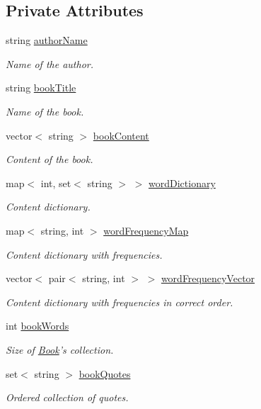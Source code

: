 \subsection*{Private Attributes}
\begin{DoxyCompactItemize}
\item 
string \hyperlink{class_book_a0dcb8f78ffb56c34e28f5d672b422e2a}{author\-Name}
\begin{DoxyCompactList}\small\item\em Name of the author. \end{DoxyCompactList}\item 
string \hyperlink{class_book_a111d7b30bddd6166bd09764f050cfee3}{book\-Title}
\begin{DoxyCompactList}\small\item\em Name of the book. \end{DoxyCompactList}\item 
vector$<$ string $>$ \hyperlink{class_book_a62ca3f4431b699fa41384c8bab7ef4fa}{book\-Content}
\begin{DoxyCompactList}\small\item\em Content of the book. \end{DoxyCompactList}\item 
map$<$ int, set$<$ string $>$ $>$ \hyperlink{class_book_a3e21a804bd433b6c1b05790856ec973f}{word\-Dictionary}
\begin{DoxyCompactList}\small\item\em Content dictionary. \end{DoxyCompactList}\item 
map$<$ string, int $>$ \hyperlink{class_book_a18b73c8d2b492cad5b7b0c187b08dfc0}{word\-Frequency\-Map}
\begin{DoxyCompactList}\small\item\em Content dictionary with frequencies. \end{DoxyCompactList}\item 
vector$<$ pair$<$ string, int $>$ $>$ \hyperlink{class_book_ac58a87d14a302f7d437c1eaa1f1901fb}{word\-Frequency\-Vector}
\begin{DoxyCompactList}\small\item\em Content dictionary with frequencies in correct order. \end{DoxyCompactList}\item 
int \hyperlink{class_book_a36f1e0b30a0ad17606976556cab45a23}{book\-Words}
\begin{DoxyCompactList}\small\item\em Size of \hyperlink{class_book}{Book}'s collection. \end{DoxyCompactList}\item 
set$<$ string $>$ \hyperlink{class_book_a370478eab144c20de936e1b68923e1c0}{book\-Quotes}
\begin{DoxyCompactList}\small\item\em Ordered collection of quotes. \end{DoxyCompactList}\end{DoxyCompactItemize}


